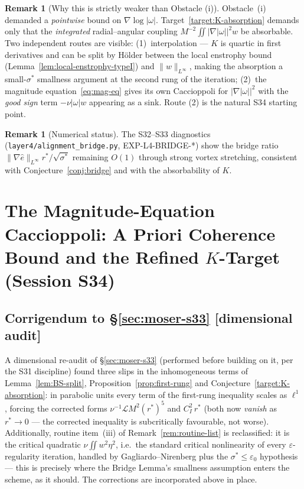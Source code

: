 \documentclass[11pt]{article}
\theoremstyle{definition}
\newtheorem{remark}[theorem]{Remark}
\theoremstyle{remark}
\begin{document}
\begin{remark}[Why this is strictly weaker than Obstacle (i)]
  Obstacle~(i) demanded a \emph{pointwise} bound on
  $\nabla\log|\omega|$. Target~\ref{target:K-absorption} demands only that
  the \emph{integrated} radial--angular coupling
  $M^{-2}\iint|\nabla|\omega||^2 w$ be absorbable. Two independent routes
  are visible: (1)~interpolation --- $K$ is quartic in first derivatives
  and can be split by H\"older between the local enstrophy bound
  (Lemma~\ref{lem:local-enstrophy-typeI}) and $\|w\|_{L^\infty}$, making
  the absorption a small-$\sigma^*$ smallness argument at the second rung
  of the iteration; (2)~the magnitude equation~\eqref{eq:mag-eq} gives its
  own Caccioppoli for $|\nabla|\omega||^2$ with the \emph{good sign} term
  $-\nu|\omega| w$ appearing as a sink. Route (2) is the natural S34
  starting point.
\end{remark}

\begin{remark}[Numerical status]
  The S32--S33 diagnostics (\texttt{layer4/alignment\_bridge.py},
  EXP-L4-BRIDGE-*) show the bridge ratio
  $\|\nabla\hat{e}\|_{L^\infty}r^*/\sqrt{\sigma^*}$ remaining $O(1)$
  through strong vortex stretching, consistent with
  Conjecture~\ref{conj:bridge} and with the absorbability of $K$.
\end{remark}

\section{The Magnitude-Equation Caccioppoli: A Priori Coherence Bound and the Refined $K$-Target (Session S34)}
\label{sec:magnitude-s34}

\subsection{Corrigendum to \S\ref{sec:moser-s33} [dimensional audit]}

A dimensional re-audit of \S\ref{sec:moser-s33} (performed before building on
it, per the S31 discipline) found three slips in the inhomogeneous terms of
Lemma~\ref{lem:BS-split}, Proposition~\ref{prop:first-rung} and
Conjecture~\ref{target:K-absorption}: in parabolic units every term of the
first-rung inequality scales as $\ell^{1}$, forcing the corrected forms
$\nu^{-1}\mathcal{L}M^2(r^*)^5$ and $C_I^2\,r^*$ (both now \emph{vanish} as
$r^*\to 0$ --- the corrected inequality is subcritically favourable, not
worse). Additionally, routine item~(iii) of Remark~\ref{rem:routine-list} is
reclassified: it is the critical quadratic $\nu\iint w^2\eta^2$, i.e.\ the
standard critical nonlinearity of every $\varepsilon$-regularity iteration,
handled by Gagliardo--Nirenberg plus the $\sigma^*\leq\varepsilon_0$
hypothesis --- this is precisely where the Bridge Lemma's smallness
assumption enters the scheme, as it should. The corrections are incorporated
above in place.
\end{document}

